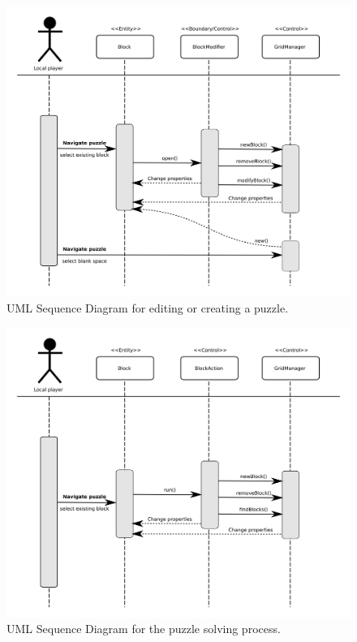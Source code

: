 \documentclass[12pt]{article}
\begin{document}
    \begin{figure}[H]
        \centering
        \includegraphics[width=4.5in]{sequence_edit.png}
        \caption{UML Sequence Diagram for editing or creating a puzzle.}
    \end{figure}


    \begin{figure}[H]
        \centering
        \includegraphics[width=4.5in]{sequence_solve.png}
        \caption{UML Sequence Diagram for the puzzle solving process.}
    \end{figure}
\end{document}
